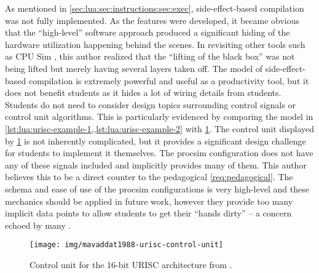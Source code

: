 As mentioned in \cref{sec:lua:sec:instructions:sec:exec}, side-effect-based compilation was not fully implemented. As the features were developed, it became obvious that the ``high-level'' software approach produced a significant hiding of the hardware utilization happening behind the scenes. In revisiting other tools such as CPU Sim \cite{Skrien2001}, this author realized that the ``lifting of the black box'' was not being lifted but merely having several layers taken off. The model of side-effect-based compilation is extremely powerful and useful as a productivity tool, but it does not benefit students as it hides a lot of wiring details from students. Students do not need to consider design topics surrounding control signals or control unit algorithms. This is particularly evidenced by comparing the model in \cref{lst:lua:urisc-example-1,,lst:lua:urisc-example-2} with \cref{fig:mavaddat1988-urisc-control-unit}. The control unit displayed by \cref{fig:mavaddat1988-urisc-control-unit} is not inherently complicated, but it provides a significant design challenge for students to implement it themselves. The procsim configuration does not have any of these signals included and implicitly provides many of them. This author believes this to be a direct counter to the pedagogical \cref{req:pedagogical}. The schema and ease of use of the procsim configurations is very high-level and these mechanics should be applied in future work, however they provide too many implicit data points to allow students to get their ``hands dirty'' -- a concern echoed by many \cite{Skrien2001,Garcia2009,Ackovska2014,Black2013}.

\begin{figure}
    \centering
    \texttt{[image: img/mavaddat1988-urisc-control-unit]}
    \caption{Control unit for the 16-bit URISC architecture from \cite[p.~331]{Mavaddat1988}.}
    \label{fig:mavaddat1988-urisc-control-unit}
\end{figure}
